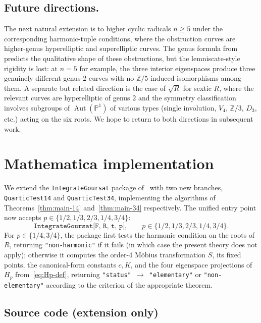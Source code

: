 \documentclass[11pt,a4paper]{article}
\theoremstyle{plain}
\theoremstyle{definition}
\theoremstyle{remark}
\newcommand{\Z}{\mathbb{Z}}
\newcommand{\Aut}{\operatorname{Aut}}
\begin{document}
\subsection*{Future directions.}
The next natural extension is to higher cyclic radicals $n \geq 5$ under the corresponding harmonic-tuple conditions, where the obstruction curves are higher-genus hyperelliptic and superelliptic curves. The genus formula from~\cite{GoursatCubic} predicts the qualitative shape of these obstructions, but the lemniscate-style rigidity is lost: at $n = 5$ for example, the three interior eigenspaces produce three genuinely different genus-$2$ curves with no $\Z/5$-induced isomorphisms among them. A separate but related direction is the case of $\sqrt{R}$ for sextic $R$, where the relevant curves are hyperelliptic of genus $2$ and the symmetry classification involves subgroups of $\Aut(\mathbb{P}^1)$ of various types (single involution, $V_4$, $\Z/3$, $D_3$, etc.) acting on the six roots. We hope to return to both directions in subsequent work.

\appendix
\section{Mathematica implementation}\label{sec:appendix}

We extend the \texttt{IntegrateGoursat} package of~\cite{GoursatCubic} with two new branches, \texttt{QuarticTest14} and \texttt{QuarticTest34}, implementing the algorithms of Theorems~\ref{thm:main-14} and~\ref{thm:main-34} respectively. The unified entry point now accepts $p \in \{1/2, 1/3, 2/3, 1/4, 3/4\}$:
\[
  \texttt{IntegrateGoursat[F, R, t, p]}, \qquad p \in \{1/2, 1/3, 2/3, 1/4, 3/4\}.
\]
For $p \in \{1/4, 3/4\}$, the package first tests the harmonic condition on the roots of $R$, returning \texttt{"non-harmonic"} if it fails (in which case the present theory does not apply); otherwise it computes the order-$4$ Möbius transformation $S$, its fixed points, the canonical-form constants $c, K$, and the four eigenspace projections of $H_p$ from~\eqref{eq:Hp-def}, returning \texttt{"status" $\to$ "elementary"} or \texttt{"non-elementary"} according to the criterion of the appropriate theorem.

\subsection*{Source code (extension only)}
\end{document}
